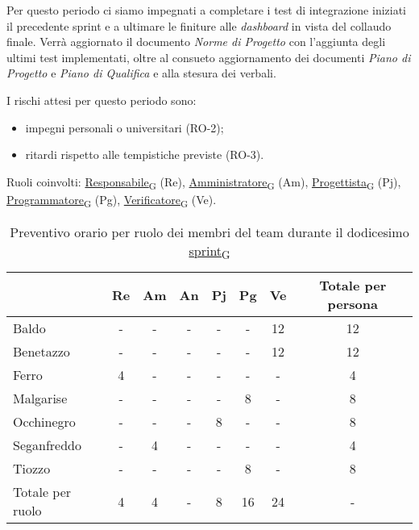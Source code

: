 Per questo periodo ci siamo impegnati a completare i test di integrazione iniziati il precedente sprint e a ultimare le finiture alle \textit{dashboard} in vista del collaudo finale. Verrà aggiornato il documento \textit{Norme di Progetto} con l'aggiunta degli ultimi test implementati, oltre al consueto aggiornamento dei documenti \textit{Piano di Progetto} e \textit{Piano di Qualifica} e alla stesura dei verbali.

I rischi attesi per questo periodo sono:
\begin{itemize}
    \item impegni personali o universitari (RO-2);
	\item ritardi rispetto alle tempistiche previste (RO-3).
\end{itemize}

\newpage
{}
Ruoli coinvolti: \href{https://7last.github.io/docs/rtb/documentazione-interna/glossario\#responsabile}{Responsabile\textsubscript{G}} (Re), \href{https://7last.github.io/docs/rtb/documentazione-interna/glossario\#amministratore}{Amministratore\textsubscript{G}} (Am), \href{https://7last.github.io/docs/rtb/documentazione-interna/glossario\#progettista}{Progettista\textsubscript{G}} (Pj), \href{https://7last.github.io/docs/rtb/documentazione-interna/glossario\#programmatore}{Programmatore\textsubscript{G}} (Pg), \href{https://7last.github.io/docs/rtb/documentazione-interna/glossario\#verificatore}{Verificatore\textsubscript{G}} (Ve).
\begin{table}[!h]
    \centering
    \begin{tabular}{ | l | c | c | c | c | c | c | c | }
        \hline
        \textbf{} & \textbf{Re} & \textbf{Am} &\textbf{An} & \textbf{Pj} & \textbf{Pg} & \textbf{Ve} & \textbf{Totale per persona} \\
        \hline
        Baldo            &  -   &  -   &  -   &  -   &  -   & 12   & 12   \\
        Benetazzo        &  -   &  -   &  -   &  -   &  -   & 12   & 12   \\
        Ferro            &  4   &  -   &  -   &  -   &  -   &  -   &  4   \\
        Malgarise        &  -   &  -   &  -   &  -   &  8   &  -   &  8   \\
        Occhinegro       &  -   &  -   &  -   &  8   &  -   &  -   &  8   \\
        Seganfreddo      &  -   &  4   &  -   &  -   &  -   &  -   &  4   \\
        Tiozzo           &  -   &  -   &  -   &  -   &  8   &  -   &  8   \\
        \hline
        Totale per ruolo &  4   &  4   &  -   &  8   & 16   & 24   &  -   \\
        \hline
    \end{tabular}
    \caption{Preventivo orario per ruolo dei membri del team durante il dodicesimo \href{https://7last.github.io/docs/rtb/documentazione-interna/glossario\#sprint}{sprint\textsubscript{G}}}
    
\end{table}

